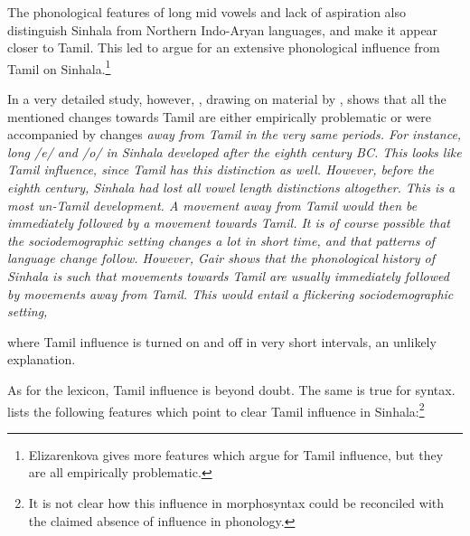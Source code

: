 \documentclass{article}
\begin{document}
The phonological features of long mid vowels and lack of aspiration also distinguish Sinhala from Northern Indo-Aryan languages, and make it appear closer to Tamil. This led \citet{Elizarenkova1972} to argue for an extensive phonological influence from Tamil on Sinhala.\footnote{Elizarenkova gives more features which argue for Tamil influence, but they are all empirically problematic. }

In a very detailed study, however, \citet{Gair1985dravidianization}, drawing on material by \citet{Karunatillake1969}, shows that all the mentioned changes towards Tamil are either empirically problematic or were accompanied by changes \em away \em from Tamil in the very same periods.  For instance, long /e/ and /o/ in Sinhala developed after the eighth century BC. This looks like Tamil influence, since Tamil has this distinction as well. However, \em before \em the eighth century, Sinhala had lost all vowel length distinctions altogether. This is a most un-Tamil development. A movement away from Tamil would then be immediately followed by a movement towards Tamil. It is of course possible that the sociodemographic setting changes a lot in short time, and that patterns of language change follow. However, Gair shows that the phonological history of Sinhala is such that movements towards Tamil are usually immediately followed by movements away from Tamil. This would entail a flickering sociodemographic setting,
 
where Tamil 
influence 
is turned on and off in very short intervals, an unlikely explanation. 


As for the lexicon, Tamil influence is beyond doubt. The same is true for syntax. \citet{Gair2012xc} lists the following features which point to clear Tamil influence in Sinhala:\footnote{It is not clear how this influence in morphosyntax could be reconciled with the claimed absence of influence in phonology.}
\end{document}
